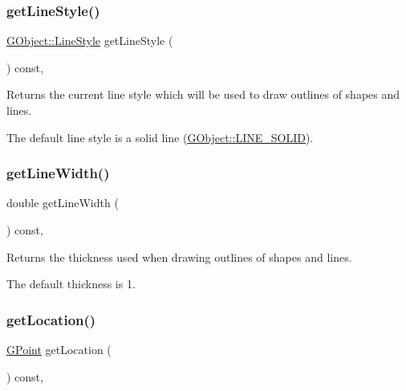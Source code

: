\subsubsection{\texorpdfstring{get\+Line\+Style()}{getLineStyle()}}
{\footnotesize\ttfamily \mbox{\hyperlink{classGObject_a86e0f5648542856159bb40775c854aa7}{G\+Object\+::\+Line\+Style}} get\+Line\+Style (\begin{DoxyParamCaption}{ }\end{DoxyParamCaption}) const\hspace{0.3cm}{\ttfamily [virtual]}, {\ttfamily [inherited]}}



Returns the current line style which will be used to draw outlines of shapes and lines. 

The default line style is a solid line (\mbox{\hyperlink{classGObject_a86e0f5648542856159bb40775c854aa7a700c78bc2cd76acaab26651bf7b4941f}{G\+Object\+::\+L\+I\+N\+E\+\_\+\+S\+O\+L\+ID}}). \mbox{\label{classGDrawingSurface_a85ff266dc3eb63d9f2d8e5a4487fd3c0}} 
\subsubsection{\texorpdfstring{get\+Line\+Width()}{getLineWidth()}}
{\footnotesize\ttfamily double get\+Line\+Width (\begin{DoxyParamCaption}{ }\end{DoxyParamCaption}) const\hspace{0.3cm}{\ttfamily [virtual]}, {\ttfamily [inherited]}}



Returns the thickness used when drawing outlines of shapes and lines. 

The default thickness is 1. \mbox{\label{classGInteractor_a4f83802015511edeb63b892830812c11}} 
\subsubsection{\texorpdfstring{get\+Location()}{getLocation()}}
{\footnotesize\ttfamily \mbox{\hyperlink{structGPoint}{G\+Point}} get\+Location (\begin{DoxyParamCaption}{ }\end{DoxyParamCaption}) const\hspace{0.3cm}{\ttfamily [virtual]}, {\ttfamily [inherited]}}



